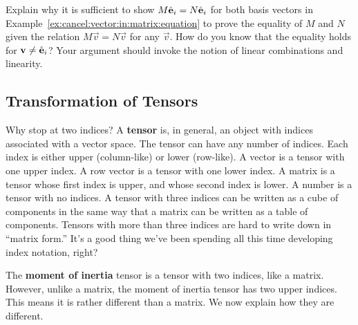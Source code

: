 \documentclass[12pt]{article}
\begin{document}
\begin{exercise}
Explain why it is sufficient to show $M\hat{\mathbf{e}}_i = N\hat{\mathbf{e}}_i$ for both basis vectors in Example~\ref{ex:cancel:vector:in:matrix:equation} to prove the equality of $M$ and $N$ given the relation $M\vec{v} = N\vec{v}$ for any $\vec{v}$. How do you know that the equality holds for $\mathbf{v} \neq \hat{\mathbf{e}}_i$? Your argument should invoke the notion of linear combinations and linearity.
\end{exercise}





\subsection{Transformation of Tensors}


Why stop at two indices? A \textbf{tensor} is, in general, an object with indices associated with a vector space. The tensor can have any number of indices. Each index is either upper (column-like) or lower (row-like). A vector is a tensor with one upper index. A row vector is a tensor with one lower index. A matrix is a tensor whose first index is upper, and whose second index is lower. A number is a tensor with no indices.  A tensor with three indices can be written as a cube of components in the same way that a matrix can be written as a table of components. Tensors with more than three indices are hard to write down in ``matrix form.'' It's a good thing we've been spending all this time developing index notation, right?
\begin{example}
The \textbf{moment of inertia} tensor is a tensor with two indices, like a matrix. However, unlike a matrix, the moment of inertia tensor has two upper indices. This means it is rather different than a matrix. We now explain how they are different.
\end{example}
\end{document}

